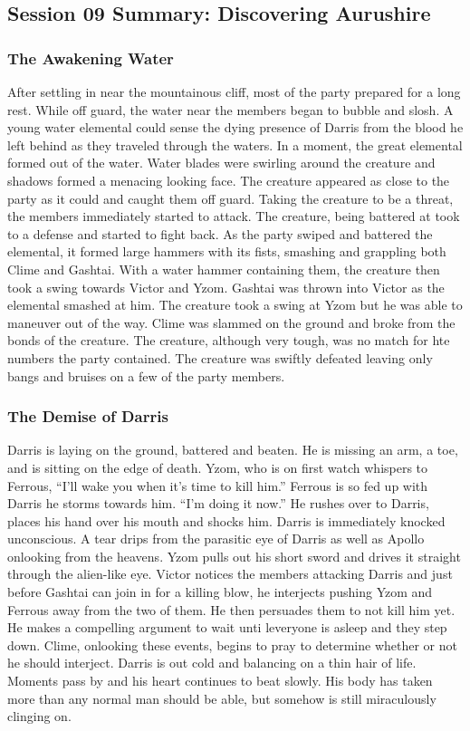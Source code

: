 \subsection{Session 09 Summary: Discovering Aurushire}

\subsubsection{The Awakening Water}

After settling in near the mountainous cliff, most of the party prepared for a long rest. While off guard, the water near the members began to bubble and slosh. A young water elemental could sense the dying presence of Darris from the blood he left behind as they traveled through the waters. In a moment, the great elemental formed out of the water. Water blades were swirling around the creature and shadows formed a menacing looking face. The creature appeared as close to the party as it could and caught them off guard.  Taking the creature to be a threat, the members immediately started to attack. The creature, being battered at took to a defense and started to fight back. As the party swiped and battered the elemental, it formed large hammers with its fists, smashing and grappling both Clime and Gashtai. With a water hammer containing them, the creature then took a swing towards Victor and Yzom. Gashtai was thrown into Victor as the elemental smashed at him. The creature took a swing at Yzom but he was able to maneuver out of the way. Clime was slammed on the ground and broke from the bonds of the creature. The creature, although very tough, was no match for hte numbers the party contained. The creature was swiftly defeated leaving only bangs and bruises on a few of the party members. 

\subsubsection{The Demise of Darris}

Darris is laying on the ground, battered and beaten. He is missing an arm, a toe, and is sitting on the edge of death. Yzom, who is on first watch whispers to Ferrous, ``I'll wake you when it's time to kill him.'' Ferrous is so fed up with Darris he storms towards him. ``I'm doing it now.'' He rushes over to Darris, places his hand over his mouth and shocks him. Darris is immediately knocked unconscious. A tear drips from the parasitic eye of Darris as well as Apollo onlooking from the heavens. Yzom pulls out his short sword and drives it straight through the alien-like eye. Victor notices the members attacking Darris and just before Gashtai can join in for a killing blow, he interjects pushing Yzom and Ferrous away from the two of them. He then persuades them to not kill him yet. He makes a compelling argument to wait unti leveryone is asleep and they step down. Clime, onlooking these events, begins to pray to determine whether or not he should interject. Darris is out cold and balancing on a thin hair of life. Moments pass by and his heart continues to beat slowly. His body has taken more than any normal man should be able, but somehow is still miraculously clinging on.

